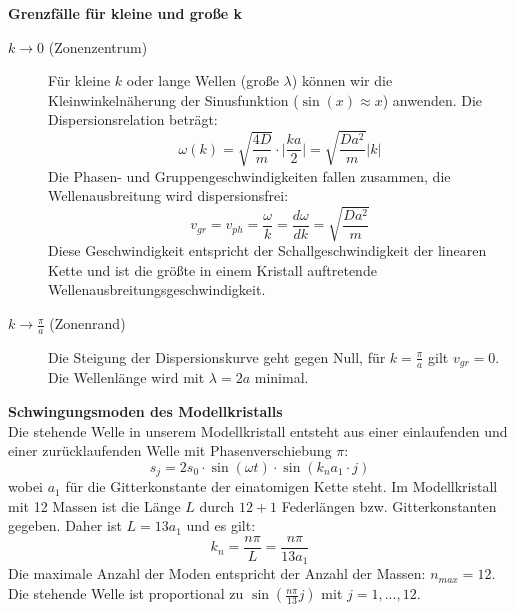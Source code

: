\documentclass[a4paper,titlepage]{scrartcl}
\numberwithin{equation}{section}
\begin{document}
\textbf{Grenzfälle für kleine und große k}
\begin{description}
  \item[$k \rightarrow 0$ (Zonenzentrum)] Für kleine $k$ oder lange Wellen (große $\lambda$) können wir die Kleinwinkelnäherung der Sinusfunktion ($\sin{(x)} \approx x$) anwenden. Die Dispersionsrelation beträgt:
  \begin{equation}
  \omega(k)=\sqrt{\frac{4D}{m}} \cdot \bigg|\frac{ka}{2}\bigg|=\sqrt{\frac{Da^2}{m}}|k|
  \label{eq:einatomDispersionsrelationLangeW}
  \end{equation}
  Die Phasen- und Gruppengeschwindigkeiten fallen zusammen, die Wellenausbreitung wird dispersionsfrei:
  \begin{equation}
  v_{gr}=v_{ph}=\frac{\omega}{k}=\frac{d \omega}{dk}=\sqrt{\frac{Da^2}{m}}
  \label{eq:einatomSchallgeschwindigkeit}
  \end{equation}
  Diese Geschwindigkeit entspricht der Schallgeschwindigkeit der linearen Kette und ist die größte in einem Kristall auftretende Wellenausbreitungsgeschwindigkeit.
  \item[$k \rightarrow \frac{\pi}{a}$ (Zonenrand)] Die Steigung der Dispersionskurve geht gegen Null, für $k=\frac{\pi}{a}$ gilt $v_{gr}=0$. Die Wellenlänge wird mit $\lambda=2a$ minimal.
\end{description}
\textbf{Schwingungsmoden des Modellkristalls}\\
Die stehende Welle in unserem Modellkristall entsteht aus einer einlaufenden und einer zurücklaufenden Welle mit Phasenverschiebung $\pi$:
\begin{equation*}
s_j=2s_0 \cdot \sin{(\omega t)} \cdot \sin{(k_n a_1 \cdot j)}
\end{equation*}
wobei $a_1$ für die Gitterkonstante der einatomigen Kette steht. Im Modellkristall mit 12 Massen ist die Länge $L$ durch $12+1$ Federlängen bzw. Gitterkonstanten gegeben. Daher ist $L=13a_1 \label{eq:einatommodell}$ und es gilt:
\begin{equation*}
k_n=\frac{n \pi}{L}=\frac{n \pi}{13 a_1}
\end{equation*}
Die maximale Anzahl der Moden entspricht der Anzahl der Massen: $n_{max}=12$. Die stehende Welle ist proportional zu $\sin{\left(\frac{n \pi}{13} j\right)}$ mit $j=1,...,12$.
\end{document}
